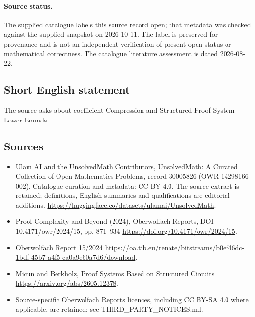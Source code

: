 \documentclass[11pt]{article}
\begin{document}
\paragraph{Source status.}
The supplied catalogue labels this source record open; that metadata was checked against the supplied snapshot on 2026-10-11. The label is preserved for provenance and is not an independent verification of present open status or mathematical correctness. The catalogue literature assessment is dated 2026-08-22.
\subsection{Short English statement}
The source asks about coefficient Compression and Structured Proof-System Lower Bounds.
\subsection{Sources}
\begin{itemize}
\item[\hypertarget{source:30005826:1}{S1}] Ulam AI and the UnsolvedMath Contributors, UnsolvedMath: A Curated Collection of Open Mathematics Problems, record 30005826 (OWR-14298166-002). Catalogue curation and metadata: CC BY 4.0. The source extract is retained; definitions, English summaries and qualifications are editorial additions.
\url{https://huggingface.co/datasets/ulamai/UnsolvedMath}.
\item[\hypertarget{source:30005826:2}{S2}] Proof Complexity and Beyond (2024), Oberwolfach Reports, DOI 10.4171/owr/2024/15, pp. 871--934
\url{https://doi.org/10.4171/owr/2024/15}.
\item[\hypertarget{source:30005826:3}{S3}] Oberwolfach Report 15/2024
\url{https://oa.tib.eu/renate/bitstreams/b0ef46dc-1bdf-45b7-a4f5-ca0a9e60a7d6/download}.
\item[\hypertarget{source:30005826:4}{S4}] Micun and Berkholz, Proof Systems Based on Structured Circuits
\url{https://arxiv.org/abs/2605.12378}.
\item Source-specific Oberwolfach Reports licences, including CC BY-SA 4.0 where applicable, are retained; see THIRD\_PARTY\_NOTICES.md.
\end{itemize}
\end{document}
